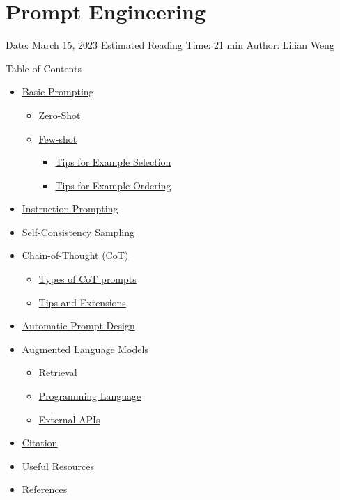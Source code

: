 \section{Prompt Engineering}\label{prompt-engineering}

Date: March 15, 2023 \textbar{} Estimated Reading Time: 21 min \textbar{} Author: Lilian Weng

{Table of Contents}

\begin{itemize}
\tightlist
\item
  \hyperref[basic-prompting]{Basic Prompting}

  \begin{itemize}
  \tightlist
  \item
    \hyperref[zero-shot]{Zero-Shot}
  \item
    \hyperref[few-shot]{Few-shot}

    \begin{itemize}
    \tightlist
    \item
      \hyperref[tips-for-example-selection]{Tips for Example Selection}
    \item
      \hyperref[tips-for-example-ordering]{Tips for Example Ordering}
    \end{itemize}
  \end{itemize}
\item
  \hyperref[instruction-prompting]{Instruction Prompting}
\item
  \hyperref[self-consistency-sampling]{Self-Consistency Sampling}
\item
  \hyperref[chain-of-thought-cot]{Chain-of-Thought (CoT)}

  \begin{itemize}
  \tightlist
  \item
    \hyperref[types-of-cot-prompts]{Types of CoT prompts}
  \item
    \hyperref[tips-and-extensions]{Tips and Extensions}
  \end{itemize}
\item
  \hyperref[automatic-prompt-design]{Automatic Prompt Design}
\item
  \hyperref[augmented-language-models]{Augmented Language Models}

  \begin{itemize}
  \tightlist
  \item
    \hyperref[retrieval]{Retrieval}
  \item
    \hyperref[programming-language]{Programming Language}
  \item
    \hyperref[external-apis]{External APIs}
  \end{itemize}
\item
  \hyperref[citation]{Citation}
\item
  \hyperref[useful-resources]{Useful Resources}
\item
  \hyperref[references]{References}
\end{itemize}

